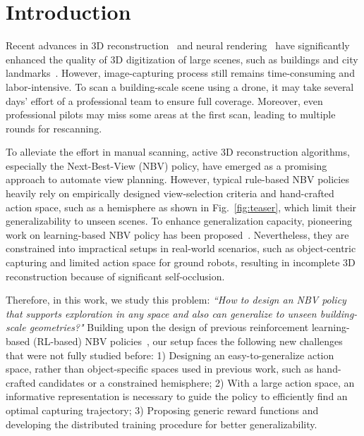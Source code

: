 \section{Introduction}
\label{sec:introduction}
\vspace{-0.1cm}
Recent advances in 3D reconstruction~\citep{park2019deepsdf, sun2021neuralrecon, sun2022neuconw} and neural rendering~\citep{mildenhall2020nerf, sun2022direct, zhang2022nerfusion} have significantly enhanced the quality of 3D digitization of large scenes, such as buildings and city landmarks~\citep{hardouin2020next, zhang2021continuous, liu2022learning, xiangli2022bungeenerf, li2023matrixcity}.
However, image-capturing process still remains time-consuming and labor-intensive. To scan a building-scale scene using a drone, it may take several days' effort of a professional team to ensure full coverage. Moreover, even professional pilots may miss some areas at the first scan, leading to multiple rounds for rescanning.


To alleviate the effort in manual scanning, active 3D reconstruction algorithms, especially the Next-Best-View (NBV) policy, have emerged as a promising approach to automate view planning. 
However, typical rule-based NBV policies~\citep{lee2022uncertainty, pan2022activenerf, zhan2022activermap, peralta2020next, guedonscone, ran2023neurar} heavily rely on empirically designed view-selection criteria and hand-crafted action space, such as a hemisphere as shown in Fig.~\ref{fig:teaser}, which limit their generalizability to unseen scenes.
To enhance generalization capacity, pioneering work on learning-based NBV policy has been proposed~\citep{peralta2020next, zhan2022activermap, chenlearning, chaplotlearning}. Nevertheless, they are constrained into impractical setups in real-world scenarios, such as object-centric capturing and limited action space for ground robots, resulting in incomplete 3D reconstruction because of significant self-occlusion.


Therefore, in this work, we study this problem: \textit{``How to design an NBV policy that supports exploration in any space and also can generalize to unseen building-scale geometries?"} 
Building upon the design of previous reinforcement learning-based (RL-based) NBV policies~\citep{peralta2020next, chenlearning, chaplotlearning}, our setup faces the following new challenges that were not fully studied before:
1) Designing an easy-to-generalize action space, rather than object-specific spaces used in previous work, such as hand-crafted candidates or a constrained hemisphere;
2) With a large action space, an informative representation is necessary to guide the policy to efficiently find an optimal capturing trajectory;
3) Proposing generic reward functions and developing the distributed training procedure for better generalizability.

